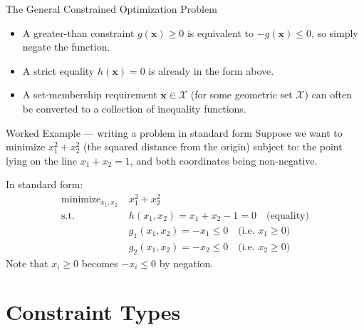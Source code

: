 \documentclass[aspectratio=169,10pt]{beamer}
\newcommand{\bx}{\mathbf{x}}
\DeclareMathOperator*{\minimize}{minimize}
\begin{document}
\begin{frame}[allowframebreaks]{The General Constrained Optimization Problem}
  \begin{itemize}
    \item A greater-than constraint $g(\bx) \ge 0$ is equivalent to $-g(\bx) \le 0$,
          so simply negate the function.
    \item A strict equality $h(\bx) = 0$ is already in the form above.
    \item A set-membership requirement $\bx \in \mathcal{X}$ (for some
          geometric set $\mathcal{X}$) can often be converted to a collection
          of inequality functions.
  \end{itemize}

  \begin{exampleblock}{Worked Example --- writing a problem in standard form}
    Suppose we want to minimize $x_1^2 + x_2^2$ (the squared distance from the
    origin) subject to: the point lying on the line $x_1 + x_2 = 1$, and both
    coordinates being non-negative.

    \medskip
    In standard form:
    \begin{align*}
      \minimize_{x_1, x_2}\; & x_1^2 + x_2^2 \\
      \text{s.t.}\;           & h(x_1,x_2) = x_1 + x_2 - 1 = 0\quad\text{(equality)}\\
                              & g_1(x_1,x_2) = -x_1 \le 0\quad\text{(i.e.\ $x_1 \ge 0$)}\\
                              & g_2(x_1,x_2) = -x_2 \le 0\quad\text{(i.e.\ $x_2 \ge 0$)}
    \end{align*}
    Note that $x_i \ge 0$ becomes $-x_i \le 0$ by negation.
  \end{exampleblock}

\end{frame}

\section{Constraint Types}
\end{document}
